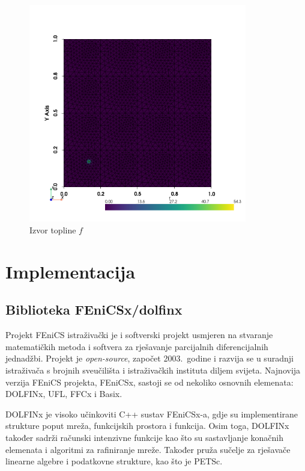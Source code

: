 \documentclass[zavrsnirad]{fer}
\begin{document}
\begin{figure}[h]
  \centering
  \includegraphics[width=0.85\textwidth]{Figures/f.png}
  \caption{Izvor topline $f$}
  \label{fig:f}
\end{figure}

\chapter{Implementacija}

\section{Biblioteka FEniCSx/dolfinx}

Projekt FEniCS istraživački je i softverski projekt usmjeren na stvaranje matematičkih metoda
i softvera za rješavanje parcijalnih diferencijalnih jednadžbi.
Projekt je \textit{open-source}, započet 2003.\ godine i razvija se u suradnji istraživača s brojnih sveučilišta
i istraživačkih instituta diljem svijeta. Najnovija verzija FEniCS projekta, FEniCSx,
sastoji se od nekoliko osnovnih elemenata: DOLFINx, UFL, FFCx i Basix.

DOLFINx je visoko učinkoviti C++ sustav FEniCSx-a,
gdje su implementirane strukture poput mreža, funkcijskih prostora i funkcija.
Osim toga, DOLFINx također sadrži računski intenzivne funkcije kao što su sastavljanje konačnih elemenata
i algoritmi za rafiniranje mreže. Također pruža sučelje za rješavače linearne algebre i podatkovne strukture, kao što je PETSc.
\end{document}
